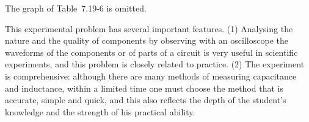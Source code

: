 The graph of Table~7.19-6 is omitted.

\begin{commentary}
This experimental problem has several important features. (1) Analysing the nature and the quality of components by observing with an oscilloscope the waveforms of the components or of parts of a circuit is very useful in scientific experiments, and this problem is closely related to practice. (2) The experiment is comprehensive: although there are many methods of measuring capacitance and inductance, within a limited time one must choose the method that is accurate, simple and quick, and this also reflects the depth of the student's knowledge and the strength of his practical ability.
\end{commentary}
